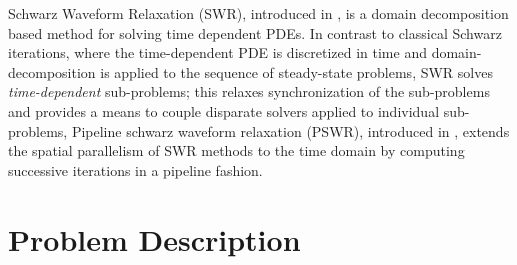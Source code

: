 \documentclass{svmult-ddm}
\begin{document}
Schwarz Waveform Relaxation (SWR), introduced in \cite{bjorhus1995},
is a domain decomposition based method for solving time dependent
PDEs.
In contrast to classical Schwarz iterations, where
the time-dependent PDE is discretized in time and domain-decomposition
is applied to the sequence of steady-state problems, SWR solves {\em
  time-dependent} sub-problems; this relaxes synchronization of the
sub-problems and provides a means to couple disparate solvers applied
to individual sub-problems,
Pipeline schwarz waveform relaxation (PSWR), introduced in \cite{ongpipeline},
extends the spatial parallelism of SWR methods to the time domain by
computing successive iterations in a pipeline fashion.

\section{Problem Description}
\label{prop_sec:waveform}
\end{document}
